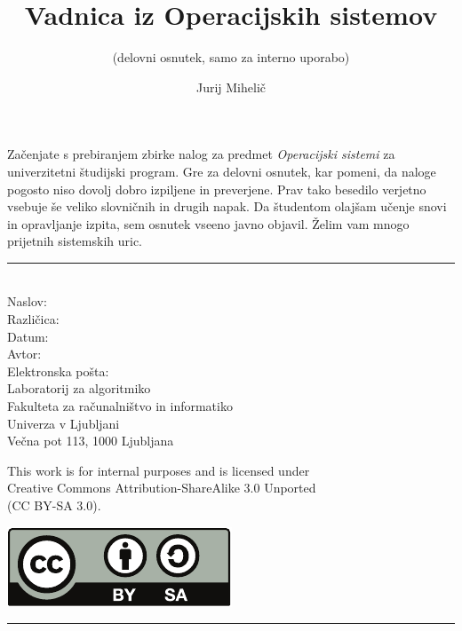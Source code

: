 \documentclass[a4paper,12pt]{scrbook}
\title{Vadnica iz Operacijskih sistemov}
\subtitle{(delovni osnutek, samo za interno uporabo)}
\author{Jurij Mihelič}
\def\vic#1{\emph{#1}}
\begin{document}
{ %
\let\cleardoublepage\clearpage
\maketitle
\thispagestyle{empty}
\noindent
Začenjate s prebiranjem zbirke nalog za predmet \vic{Operacijski sistemi} za univerzitetni študijski program.
Gre za delovni osnutek, kar pomeni, da naloge pogosto niso dovolj dobro izpiljene in preverjene.
Prav tako besedilo verjetno vsebuje še veliko slovničnih in drugih napak.
Da študentom olajšam učenje snovi in opravljanje izpita, sem osnutek vseeno javno objavil. Želim vam mnogo prijetnih sistemskih uric.
\vfill
\noindent\rule{\textwidth}{0.4pt}\\[.5\baselineskip]
Naslov: \makeatletter\@title\makeatother\\
Različica: \makeatletter\@version\makeatother\\
Datum: \makeatletter\@date\makeatother\\[\baselineskip]
Avtor: \makeatletter\@author\makeatother\\
Elektronska pošta: \makeatletter\@email\makeatother\\[\baselineskip]
Laboratorij za algoritmiko\\
Fakulteta za računalništvo in informatiko\\
Univerza v Ljubljani\\
Večna pot 113, 1000 Ljubljana\\[\baselineskip]
\parbox{12cm}{This work is for internal purposes and is licensed under\\ Creative Commons Attribution-ShareAlike 3.0 Unported\\
(CC BY-SA 3.0).}
\hfill\includegraphics[scale=0.6]{cc-by-sa.pdf}\\[.5\baselineskip]
\noindent\rule{\textwidth}{0.4pt}\\[\baselineskip]
\clearpage
}
\makeatother

\tableofcontents






\end{document}
